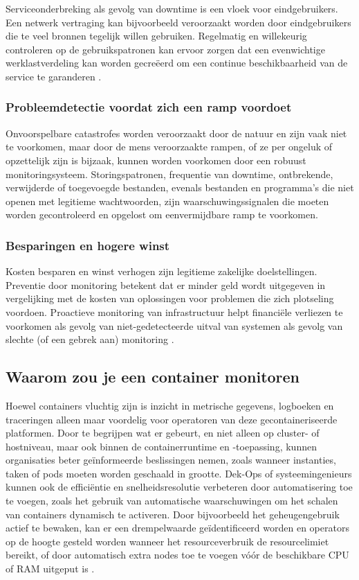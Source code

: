 Serviceonderbreking als gevolg van downtime is een vloek voor eindgebruikers. Een netwerk vertraging kan bijvoorbeeld veroorzaakt worden door eindgebruikers die te veel bronnen tegelijk willen gebruiken. Regelmatig en willekeurig controleren op de gebruikspatronen kan ervoor zorgen dat een evenwichtige werklastverdeling kan worden gecreëerd om een ​​continue beschikbaarheid van de service te garanderen \autocite{Matrix2016}.

\subsubsection{Probleemdetectie voordat zich een ramp voordoet}

Onvoorspelbare catastrofes worden veroorzaakt door de natuur en zijn vaak niet te voorkomen, maar door de mens veroorzaakte rampen, of ze per ongeluk of opzettelijk zijn is bijzaak, kunnen worden voorkomen door een robuust monitoringsysteem. Storingspatronen, frequentie van downtime, ontbrekende, verwijderde of toegevoegde bestanden, evenals bestanden en programma's die niet openen met legitieme wachtwoorden, zijn waarschuwingssignalen die moeten worden gecontroleerd en opgelost om een ​​vermijdbare ramp te voorkomen\autocite{Matrix2016}.

\subsubsection{Besparingen en hogere winst}

Kosten besparen en winst verhogen zijn legitieme zakelijke doelstellingen. Preventie door monitoring betekent dat er minder geld wordt uitgegeven in vergelijking met de kosten van oplossingen voor problemen die zich plotseling voordoen. Proactieve monitoring van infrastructuur helpt financiële verliezen te voorkomen als gevolg van niet-gedetecteerde uitval van systemen als gevolg van slechte (of een gebrek aan) monitoring \autocite{Matrix2016}. 

\subsection{Waarom zou je een container monitoren}

Hoewel containers vluchtig zijn is inzicht in metrische gegevens, logboeken en traceringen alleen maar voordelig voor operatoren van deze gecontaineriseerde platformen. Door te begrijpen wat er gebeurt, en niet alleen op cluster- of hostniveau, maar ook binnen de containerruntime en -toepassing, kunnen organisaties beter geïnformeerde beslissingen nemen, zoals wanneer instanties, taken of pods moeten worden geschaald in grootte. Dek-Ops of systeemingenieurs kunnen ook de efficiëntie en snelheidsresolutie verbeteren door automatisering toe te voegen, zoals het gebruik van automatische waarschuwingen om het schalen van containers dynamisch te activeren. Door bijvoorbeeld het geheugengebruik actief te bewaken, kan er een drempelwaarde geïdentificeerd worden en operators op de hoogte gesteld worden wanneer het resourceverbruik de resourcelimiet bereikt, of door automatisch extra nodes toe te voegen vóór de beschikbare CPU of RAM uitgeput is \autocite{AWS2021}. 

